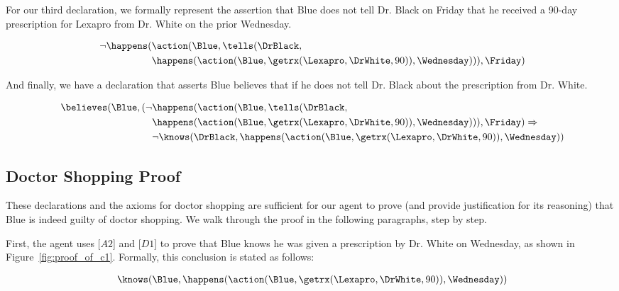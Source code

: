\noindent For our third declaration, we formally represent the assertion that Blue does not tell Dr. Black on Friday that he received a 90-day prescription for Lexapro from Dr. White on the prior Wednesday.
\begin{footnotesize}
\begin{align*}
[D3] \ \neg\happens(&\action(\Blue,\tells(\DrBlack, \\
	& \happens(\action(\Blue,\getrx(\Lexapro,\DrWhite,90)),\Wednesday))),\Friday)
\end{align*}
\end{footnotesize}

\noindent And finally, we have a declaration that asserts Blue believes that if he does not tell Dr. Black about the prescription from Dr. White.
\begin{footnotesize}
\begin{align*}
[D4] \ \believes(\Blue,(\neg&\happens(\action(\Blue,\tells(\DrBlack,\\
	& \happens(\action(\Blue,\getrx(\Lexapro,\DrWhite,90)),\Wednesday))),\Friday) \Rightarrow \\
	& \neg\knows(\DrBlack,\happens(\action(\Blue,\getrx(\Lexapro,\DrWhite,90)),\Wednesday))
\end{align*}
\end{footnotesize}

\subsection{Doctor Shopping Proof}

These declarations and the axioms for doctor shopping are sufficient for our agent to prove (and provide justification for its reasoning) that Blue is indeed guilty of doctor shopping.  We walk through the proof in the following paragraphs, step by step.



First, the agent uses [$A2$] and [$D1$] to prove that Blue knows he was given a prescription by Dr. White on Wednesday, as shown in Figure~\ref{fig:proof_of_c1}.  Formally, this conclusion is stated as follows:
\begin{footnotesize}
\begin{align*}
[C1] \ \knows(\Blue,\happens(\action(\Blue,\getrx(\Lexapro,\DrWhite,90)),\Wednesday))
\end{align*}
\end{footnotesize}

